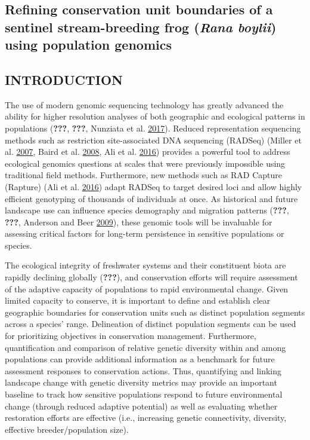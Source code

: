 \documentclass[proquest,12pt,final]{ucthesis-CA2012} %
\begin{document}
\begin{ucmainmatter}
{\chapter{\texorpdfstring{Refining conservation unit boundaries of a
sentinel stream-breeding frog (\emph{Rana boylii}) using population
genomics}{Refining conservation unit boundaries of a sentinel stream-breeding frog (Rana boylii) using population genomics}}\label{rangewide}}

\hypertarget{introduction-2}{%
\section{INTRODUCTION}\label{introduction-2}}

The use of modern genomic sequencing technology has greatly advanced the
ability for higher resolution analyses of both geographic and ecological
patterns in populations ({\textbf{???}}, {\textbf{???}}, Nunziata et al.
\protect\hyperlink{ref-nunziata_genomic_2017}{2017}). Reduced
representation sequencing methods such as restriction site-associated
DNA sequencing (RADSeq) (Miller et al.
\protect\hyperlink{ref-miller_rapid_2007}{2007}, Baird et al.
\protect\hyperlink{ref-baird_rapid_2008}{2008}, Ali et al.
\protect\hyperlink{ref-ali_rad_2016}{2016}) provides a powerful tool to
address ecological genomics questions at scales that were previously
impossible using traditional field methods. Furthermore, new methods
such as RAD Capture (Rapture) (Ali et al.
\protect\hyperlink{ref-ali_rad_2016}{2016}) adapt RADSeq to target
desired loci and allow highly efficient genotyping of thousands of
individuals at once. As historical and future landscape use can
influence species demography and migration patterns ({\textbf{???}},
{\textbf{???}}, Anderson and Beer
\protect\hyperlink{ref-anderson_oceanic_2009}{2009}), these genomic
tools will be invaluable for assessing critical factors for long-term
persistence in sensitive populations or species.

The ecological integrity of freshwater systems and their constituent
biota are rapidly declining globally ({\textbf{???}}), and conservation
efforts will require assessment of the adaptive capacity of populations
to rapid environmental change. Given limited capacity to conserve, it is
important to define and establish clear geographic boundaries for
conservation units such as distinct population segments across a
species' range. Delineation of distinct population segments can be used
for prioritizing objectives in conservation management. Furthermore,
quantification and comparison of relative genetic diversity within and
among populations can provide additional information as a benchmark for
future assessment responses to conservation actions. Thus, quantifying
and linking landscape change with genetic diversity metrics may provide
an important baseline to track how sensitive populations respond to
future environmental change (through reduced adaptive potential) as well
as evaluating whether restoration efforts are effective (i.e.,
increasing genetic connectivity, diversity, effective breeder/population
size).


\end{ucmainmatter}
\end{document}
